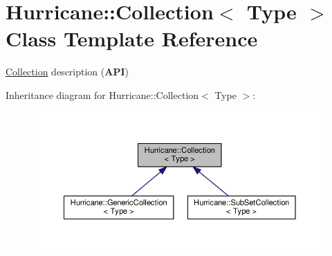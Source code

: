 \hypertarget{classHurricane_1_1Collection}{\section{Hurricane\-:\-:Collection$<$ Type $>$ Class Template Reference}
\label{classHurricane_1_1Collection}
}


\hyperlink{classHurricane_1_1Collection}{Collection} description ({\bfseries A\-P\-I})  




Inheritance diagram for Hurricane\-:\-:Collection$<$ Type $>$\-:\nopagebreak
\begin{figure}[H]
\begin{center}
\leavevmode
\includegraphics[width=350pt]{classHurricane_1_1Collection__inherit__graph}
\end{center}
\end{figure}

